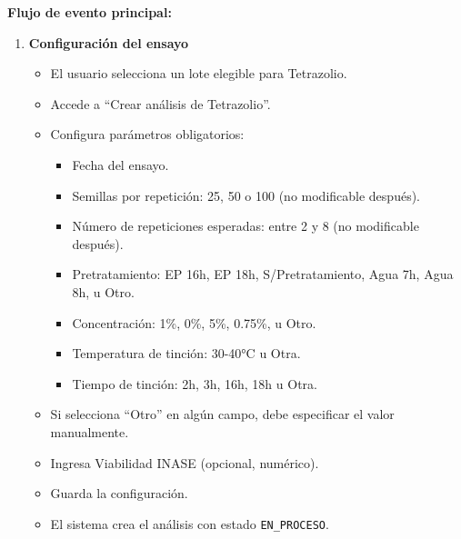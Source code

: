 \vspace{0.5em}
\noindent\textbf{Flujo de evento principal:}
\begin{enumerate}[nosep]
    \item \textbf{Configuración del ensayo}
    \begin{itemize}[nosep]
        \item El usuario selecciona un lote elegible para Tetrazolio.
        \item Accede a ``Crear análisis de Tetrazolio''.
        \item Configura parámetros obligatorios:
        \begin{itemize}[nosep]
            \item Fecha del ensayo.
            \item Semillas por repetición: 25, 50 o 100 (no modificable después).
            \item Número de repeticiones esperadas: entre 2 y 8 (no modificable después).
            \item Pretratamiento: EP 16h, EP 18h, S/Pretratamiento, Agua 7h, Agua 8h, u Otro.
            \item Concentración: 1\%, 0\%, 5\%, 0.75\%, u Otro.
            \item Temperatura de tinción: 30-40°C u Otra.
            \item Tiempo de tinción: 2h, 3h, 16h, 18h u Otra.
        \end{itemize}
        \item Si selecciona ``Otro'' en algún campo, debe especificar el valor manualmente.
        \item Ingresa Viabilidad INASE (opcional, numérico).
        \item Guarda la configuración.
        \item El sistema crea el análisis con estado \texttt{EN\_PROCESO}.
    \end{itemize}
\end{enumerate}

